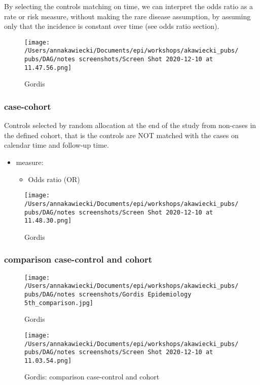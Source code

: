 \documentclass[
]{article}
\providecommand{\tightlist}{%
  \setlength{\itemsep}{0pt}\setlength{\parskip}{0pt}}
\begin{document}
By selecting the controls matching on time, we can interpret the odds
ratio as a rate or risk measure, without making the rare disease
assumption, by assuming only that the incidence is constant over time
(see odds ratio section).

\begin{figure}
\centering
\texttt{[image: /Users/annakawiecki/Documents/epi/workshops/akawiecki\_pubs/pubs/DAG/notes screenshots/Screen Shot 2020-12-10 at 11.47.56.png]}
\caption{Gordis}
\end{figure}

\hypertarget{case-cohort}{%
\subsubsection{case-cohort}\label{case-cohort}}

Controls selected by random allocation at the end of the study from
non-cases in the defined cohort, that is the controls are NOT matched
with the cases on calendar time and follow-up time.

\begin{itemize}
\item
  measure:

  \begin{itemize}
  \tightlist
  \item
    Odds ratio (OR)
  \end{itemize}
\end{itemize}

\begin{figure}
\centering
\texttt{[image: /Users/annakawiecki/Documents/epi/workshops/akawiecki\_pubs/pubs/DAG/notes screenshots/Screen Shot 2020-12-10 at 11.48.30.png]}
\caption{Gordis}
\end{figure}

\hypertarget{comparison-case-control-and-cohort}{%
\subsubsection{\texorpdfstring{\textbf{comparison case-control and
cohort}}{comparison case-control and cohort}}\label{comparison-case-control-and-cohort}}

\begin{figure}
\centering
\texttt{[image: /Users/annakawiecki/Documents/epi/workshops/akawiecki\_pubs/pubs/DAG/notes screenshots/Gordis Epidemiology 5th\_comparison.jpg]}
\caption{Gordis}
\end{figure}

\begin{figure}
\centering
\texttt{[image: /Users/annakawiecki/Documents/epi/workshops/akawiecki\_pubs/pubs/DAG/notes screenshots/Screen Shot 2020-12-10 at 11.03.54.png]}
\caption{Gordis: comparison case-control and cohort}
\end{figure}
\end{document}
